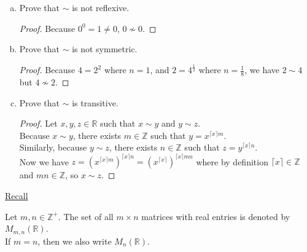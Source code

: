 \documentclass[12pt]{amsart}
\begin{document}
\begin{enumerate}[{\bfseries 1.}]
\begin{enumerate}[(a)]
	\vspace{0.3in}
	\item Prove that $\sim$ is not reflexive.
		\begin{proof}
		Because $0^0 = 1 \neq 0$, $0\nsim 0$.
		\end{proof}
	\vspace{0.1in}
	\item Prove that $\sim$ is not symmetric.
		\begin{proof}
		Because $4 = 2^2$ where $n = 1$, and $2 = 4^{\frac{1}{2}}$ where $n = \frac{1}{8}$, we have $2\sim 4$ but $4\nsim 2$.
		\end{proof}
	\vspace{0.1in}
	\item Prove that $\sim$ is transitive.
	    \begin{proof}
		Let $x, y, z\in\mathbb{R}$ such that $x\sim y$ and $y\sim z$.
		\\Because $x\sim y$, there exists $m\in\mathbb{Z}$ such that $y = x^{\lceil x \rceil m}$.
		\\Similarly, because $y\sim z$, there exists $n\in\mathbb{Z}$ such that $z = y^{\lceil x \rceil n}$.
		\\Now we have $z = (x^{\lceil x \rceil m})^{\lceil x \rceil n} = (x ^ {\lceil x \rceil})^{\lceil x \rceil mn}$ where by definition $\lceil x \rceil \in\mathbb{Z}$ and $mn\in\mathbb{Z}$, so $x\sim z$.
		\end{proof}
	\end{enumerate}
\end{enumerate}

\newpage
\noindent
\underline{Recall}

\vspace{0.05in}
\noindent
Let $m, n\in\mathbb{Z}^{+}$.  The set of all $m\times n$ matrices with real entries is denoted by $M_{m,n}(\mathbb{R})$. \\
If $m=n$, then we also write $M_{n}(\mathbb{R})$.
\end{document}
